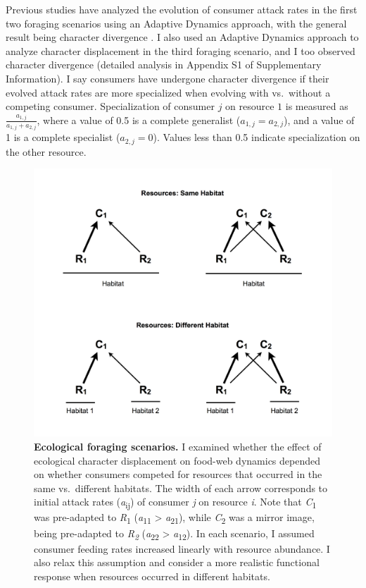 \documentclass[11pt,]{article}
\begin{document}
Previous studies have analyzed the evolution of consumer attack rates in
the first two foraging scenarios using an Adaptive Dynamics approach,
with the general result being character divergence
\citep{Lawlor1976, Abrams1986}. I also used an Adaptive Dynamics
approach to analyze character displacement in the third foraging
scenario, and I too observed character divergence (detailed analysis in
Appendix S1 of Supplementary Information). I say consumers have
undergone character divergence if their evolved attack rates are more
specialized when evolving with vs.~without a competing consumer.
Specialization of consumer \(j\) on resource \(1\) is measured as
\(\frac{a_{1,j}}{a_{1,j}+a_{2,j}}\), where a value of 0.5 is a complete
generalist (\(a_{1,j}=a_{2,j}\)), and a value of 1 is a complete
specialist (\(a_{2,j}=0\)). Values less than 0.5 indicate specialization
on the other resource.

\begin{figure}
\centering
\includegraphics{ECD_model_foraging_scenarios}
\caption{\label{fig:foraging_scenarios}\textbf{Ecological foraging
scenarios.} I examined whether the effect of ecological character
displacement on food-web dynamics depended on whether consumers competed
for resources that occurred in the same vs.~different habitats. The
width of each arrow corresponds to initial attack rates
(\emph{a}\textsubscript{ij}) of consumer \emph{j} on resource \emph{i}.
Note that \emph{C}\textsubscript{1} was pre-adapted to
\emph{R}\textsubscript{1} (\emph{a}\textsubscript{11} \textgreater{}
\emph{a}\textsubscript{21}), while \emph{C}\textsubscript{2} was a
mirror image, being pre-adapted to \emph{R\textsubscript{2}}
(\emph{a}\textsubscript{22} \textgreater{} \emph{a}\textsubscript{12}).
In each scenario, I assumed consumer feeding rates increased linearly
with resource abundance. I also relax this assumption and consider a
more realistic functional response when resources occurred in different
habitats.}
\end{figure}
\end{document}
